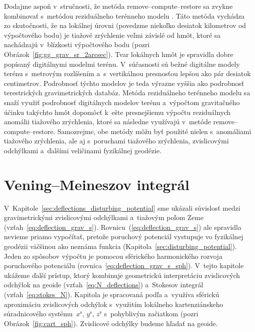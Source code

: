 \documentclass[a4paper, 12pt]{book}
\begin{document}
Dodajme aspoň v~stručnosti, že metóda remove--compute--restore sa zvykne 
kombinovať s~metódou reziduálneho terénneho modelu 
\parencite{Forsberg1981,Forsberg1984}.  Táto metóda vychádza zo skutočnosti, že 
na lokálnej úrovni (povedzme niekoľko desiatok kilometrov od výpočtového bodu) 
je tiažové zrýchlenie veľmi závislé od hmôt, ktoré sa nachádzajú v~blízkosti 
výpočtového bodu (pozri Obrázok~\ref{fig:gg_grav_sr_2arcsec}).  Tvar lokálnych 
hmôt je spravidla dobre popísaný digitálnymi modelmi terénu.  V~súčasnosti sú 
bežné digitálne modely terénu s~metrovým rozlíšením a~s~vertikálnou presnosťou 
lepšou ako pár desiatok centimetrov.  Podrobnosť týchto modelov je teda výrazne 
vyššia ako podrobnosť terestrických gravimetrických databáz.  Metóda 
reziduálneho terénneho modelu sa snaží využiť podrobnosť digitálnych modelov 
terénu a~výpočtom gravitačného účinku takýchto hmôt dopomôcť k~ešte 
presnejšiemu výpočtu reziduálnych anomálii tiažového zrýchlenia, ktoré sa 
následne využívajú v~metóde remove--compute--restore.  Samozrejme, obe metódy 
môžu byť použité nielen s~anomáliami tiažového zrýchlenia, ale aj s~poruchami 
tiažového zrýchlenia, zvislicovými odchýlkami a~ďalšími veličinami fyzikálnej 
geodézie.




\section{Vening--Meineszov integrál}
\label{sec:vm_integral}

V~Kapitole~\ref{sec:deflections_disturbing_potential} sme ukázali súvislosť 
medzi gravimetrickými zvislicovými odchýlkami a~tiažovým poľom Zeme 
(vzťah~\ref{eq:deflection_grav_s}).  Rovnicu~(\ref{eq:deflection_grav_s}) ale 
spravidla nevieme priamo vypočítať, pretože poruchový potenciál vystupuje vo 
fyzikálnej geodézii väčšinou ako neznáma funkcia 
(Kapitola~\ref{sec:disturbing_potential}).  Jeden zo spôsobov výpočtu je 
pomocou sférického harmonického rozvoja poruchového potenciálu 
(rovnica~\ref{eq:deflection_grav_s_sph}).  V~tejto kapitole ukážeme ďalší 
prístup, ktorý kombinuje geometrickú interpretáciu zvislicových odchýlok na 
geoide (vzťah~\ref{eq:N_deflections}) a~Stokesov integrál 
(vzťah~\ref{eq:stokes_N}).  Kapitola je spracovaná podľa 
\textcite{MoritzPhysicalGeodesy} a~využíva sférickú aproximáciu zvislicových 
odchýlok s~využitím lokálneho kartenziánskeho súradnicového 
systému~$x^\mathrm{s}$, $y^\mathrm{s}$, $z^\mathrm{s}$ s~pohyblivým začiatkom 
(pozri Obrázok~\ref{fig:cart_sph}).  Zvislicové odchýlky budeme hľadať na 
geoide.
\end{document}
